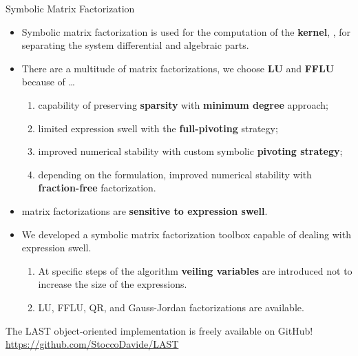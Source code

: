 \begin{frame}{Symbolic Matrix Factorization}
  \begin{itemize}
    \item Symbolic matrix factorization is used for the computation of the \textbf{kernel}, \ie{}, for separating the system differential and algebraic parts.
    \item There are a multitude of matrix factorizations, we choose \textbf{\ac{LU}} and \textbf{\ac{FFLU}} because of \dots
    \begin{enumerate}
      \item capability of preserving \textbf{sparsity} with \textbf{minimum degree} approach;
      \item limited expression swell with the \textbf{full-pivoting} strategy;
      \item improved numerical stability with custom symbolic \textbf{pivoting strategy};
      \item depending on the formulation, improved numerical stability with \textbf{fraction-free} factorization.
    \end{enumerate}
    \item \Maple{} matrix factorizations are \textbf{sensitive to expression swell}.
    \item We developed a symbolic matrix factorization toolbox capable of dealing with expression swell.
    \begin{enumerate}
      \item At specific steps of the algorithm \textbf{veiling variables} are introduced not to increase the size of the expressions.
      \item \ac{LU}, \ac{FFLU}, \ac{QR}, and Gauss-Jordan factorizations are available.
    \end{enumerate}
\end{itemize}
  \begin{bbox}
  The LAST object-oriented implementation is freely available on GitHub! \\
  \centering \url{https://github.com/StoccoDavide/LAST}
\end{bbox}
\end{frame}

